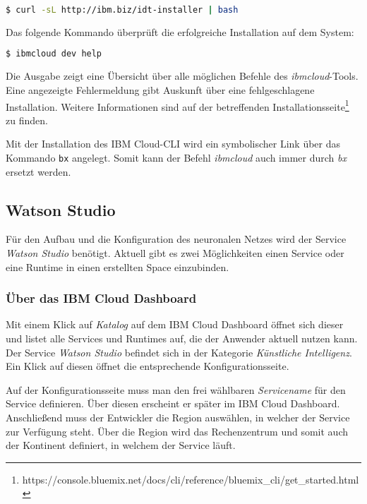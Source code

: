 \begin{lstlisting}[language=bash, caption=Installation des IBM Cloud CLI, label=Installation des IBM Cloud CLI]
    $ curl -sL http://ibm.biz/idt-installer | bash
\end{lstlisting}

Das folgende Kommando überprüft die erfolgreiche Installation auf dem System:

\begin{lstlisting}[language=bash, caption=Installation des CLI überprüfen, label=Installation des CLI überprüfen]
    $ ibmcloud dev help
\end{lstlisting}

Die Ausgabe zeigt eine Übersicht über alle möglichen Befehle des \textit{ibmcloud}-Tools. Eine angezeigte Fehlermeldung
gibt Auskunft über eine fehlgeschlagene Installation. Weitere Informationen sind auf der betreffenden
Installationsseite\footnote{https://console.bluemix.net/docs/cli/reference/bluemix\_cli/get\_started.html} zu finden.

Mit der Installation des IBM Cloud-CLI wird ein symbolischer Link über das Kommando \texttt{bx} angelegt. Somit kann der
Befehl \textit{ibmcloud} auch immer durch \textit{bx} ersetzt werden.

\subsection{Watson Studio}
Für den Aufbau und die Konfiguration des neuronalen Netzes wird der Service \textit{Watson Studio} benötigt. Aktuell gibt
es zwei Möglichkeiten einen Service oder eine Runtime in einen erstellten Space einzubinden.

\subsubsection*{Über das IBM Cloud Dashboard}
Mit einem Klick auf \textit{Katalog} auf dem IBM Cloud Dashboard öffnet sich dieser und listet alle Services und Runtimes
auf, die der Anwender aktuell nutzen kann. Der Service \textit{Watson Studio} befindet sich in der Kategorie
\textit{Künstliche Intelligenz}. Ein Klick auf diesen öffnet die entsprechende Konfigurationsseite.

Auf der Konfigurationsseite muss man den frei wählbaren \textit{Servicename} für den Service definieren. Über diesen
erscheint er später im IBM Cloud Dashboard. Anschließend muss der Entwickler die Region auswählen, in welcher der Service
zur Verfügung steht. Über die Region wird das Rechenzentrum und somit auch der Kontinent definiert, in welchem der Service
läuft.

